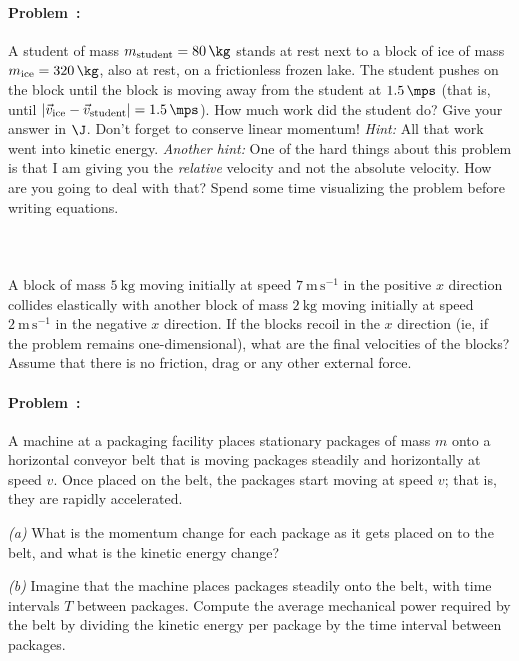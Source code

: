 \documentclass[12pt]{article}
\newcounter{problem}
\begin{document}
\paragraph{Problem~\theproblem:}%
A student of mass $m_\mathrm{student}=80\,\kg$ stands at rest next to
a block of ice of mass $m_\mathrm{ice}=320\,\kg$, also at rest, on a
frictionless frozen lake.  The student pushes on the block until the
block is moving away from the student at $1.5\,\mps$ (that is, until
$\left|\vec{v}_\mathrm{ice}-\vec{v}_\mathrm{student}\right|=1.5\,\mps$).
How much work did the student do?  Give your answer in $\J$.  Don't
forget to conserve linear momentum!  \emph{Hint:} All that work went into
kinetic energy.  \emph{Another hint:} One of the hard things about
this problem is that I am giving you the \emph{relative} velocity and
not the absolute velocity.  How are you going to deal with that?
Spend some time visualizing the problem before writing equations.

\paragraph{\problemname~\theproblem}

A block of mass $5~\mathrm{kg}$ moving initially at speed
$7~\mathrm{m\,s^{-1}}$ in the positive $x$ direction collides
elastically with another block of mass $2~\mathrm{kg}$ moving
initially at speed $2~\mathrm{m\,s^{-1}}$ in the negative $x$
direction.  If the blocks recoil in the $x$ direction (ie, if the
problem remains one-dimensional), what are the final velocities of the
blocks?  Assume that there is no friction, drag or any other external
force.

\paragraph{Problem~\theproblem:}%
A machine at a packaging facility places stationary packages of mass
$m$ onto a horizontal conveyor belt that is moving packages steadily
and horizontally at speed $v$. Once placed on the belt, the packages
start moving at speed $v$; that is, they are rapidly accelerated.

\textsl{(a)} What is the momentum change for each package as it
gets placed on to the belt, and what is the kinetic energy change?

\textsl{(b)} Imagine that the machine places packages steadily onto
the belt, with time intervals $T$ between packages. Compute the
average mechanical power required by the belt by dividing the kinetic
energy per package by the time interval between packages.
\end{document}
